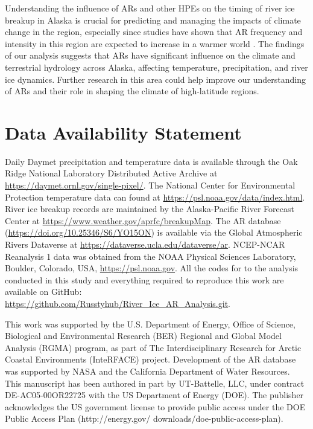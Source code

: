 \documentclass[12pts,draft]{AR_analysis_}
\begin{document}
Understanding the influence of ARs and other HPEs on the
timing of river ice breakup in Alaska is 
crucial for predicting and managing the impacts of climate change in the region, 
especially since studies have shown that AR frequency and intensity in this region are 
expected to increase in a warmer world \cite{Espinoza2018, Massoud2019}. The findings 
of our analysis suggests that ARs have significant influence on the climate and
terrestrial hydrology across Alaska, 
affecting temperature, precipitation, and river ice dynamics. Further research in this 
area could help improve our understanding of ARs and their role in shaping the climate 
of high-latitude regions.


%
%

\section*{Data Availability Statement}
Daily Daymet precipitation and temperature data is available through the Oak Ridge 
National Laboratory Distributed Active Archive at \url{https://daymet.ornl.gov/single-pixel/}.
The National Center for Environmental Protection temperature data can found at
\url{https://psl.noaa.gov/data/index.html}.
River ice breakup records are maintained by the Alaska-Pacific River Forecast Center 
at \url{https://www.weather.gov/aprfc/breakupMap}. The AR database 
(\url{https://doi.org/10.25346/S6/YO15ON}) is available via the Global 
Atmospheric Rivers Dataverse at \url{https://dataverse.ucla.edu/dataverse/ar}.
NCEP-NCAR Reanalysis 1 data was obtained from the 
NOAA Physical Sciences Laboratory, Boulder, Colorado, USA, \url{https://psl.noaa.gov}.
All the codes for to the analysis conducted in this study and everything required 
to reproduce this work are available 
on GitHub: \url{https://github.com/Russtyhub/River_Ice_AR_Analysis.git}.


\acknowledgments
This work was supported by the U.S. Department of
Energy, Office of Science, Biological and Environmental Research (BER)
Regional and Global Model Analysis (RGMA) program, as part of The 
Interdisciplinary Research for Arctic Coastal Environments (InteRFACE) 
project. Development of the AR database was supported by NASA and the 
California Department of Water Resources. 
This manuscript has been authored in part by UT-Battelle, LLC, under contract
DE-AC05-00OR22725 with the US Department of Energy (DOE).
The publisher acknowledges the US government license to provide
public access under the DOE Public Access Plan (http://energy.gov/
downloads/doe-public-access-plan).
\end{document}
